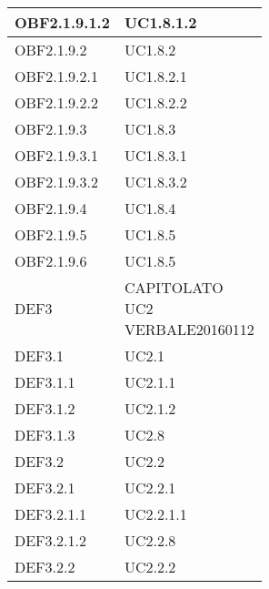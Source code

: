 \documentclass{scalatekids-article}
\begin{document}
\begin{longtable}[H]{|p{5.5cm}|p{5.5cm}|}
OBF2.1.9.1.2 & \multiLineCell[t]{UC1.8.1.2\\}\\
\hline
OBF2.1.9.2 & \multiLineCell[t]{UC1.8.2\\}\\
\hline
OBF2.1.9.2.1 & \multiLineCell[t]{UC1.8.2.1\\}\\
\hline
OBF2.1.9.2.2 & \multiLineCell[t]{UC1.8.2.2\\}\\
\hline
OBF2.1.9.3 & \multiLineCell[t]{UC1.8.3\\}\\
\hline
OBF2.1.9.3.1 & \multiLineCell[t]{UC1.8.3.1\\}\\
\hline
OBF2.1.9.3.2 & \multiLineCell[t]{UC1.8.3.2\\}\\
\hline
OBF2.1.9.4 & \multiLineCell[t]{UC1.8.4\\}\\
\hline
OBF2.1.9.5 & \multiLineCell[t]{UC1.8.5\\}\\
\hline
OBF2.1.9.6 & \multiLineCell[t]{UC1.8.5\\}\\
\hline
DEF3 & \multiLineCell[t]{CAPITOLATO\\UC2\\VERBALE20160112\\}\\
\hline
DEF3.1 & \multiLineCell[t]{UC2.1\\}\\
\hline
DEF3.1.1 & \multiLineCell[t]{UC2.1.1\\}\\
\hline
DEF3.1.2 & \multiLineCell[t]{UC2.1.2\\}\\
\hline
DEF3.1.3 & \multiLineCell[t]{UC2.8\\}\\
\hline
DEF3.2 & \multiLineCell[t]{UC2.2\\}\\
\hline
DEF3.2.1 & \multiLineCell[t]{UC2.2.1\\}\\
\hline
DEF3.2.1.1 & \multiLineCell[t]{UC2.2.1.1\\}\\
\hline
DEF3.2.1.2 & \multiLineCell[t]{UC2.2.8\\}\\
\hline
DEF3.2.2 & \multiLineCell[t]{UC2.2.2\\}\\

\end{longtable}
\end{document}
